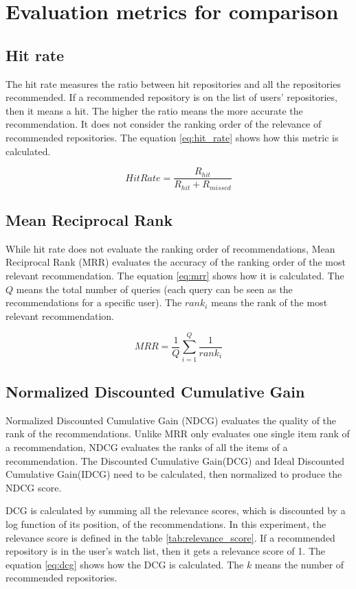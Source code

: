 \documentclass[11pt,twoside]{report}
\begin{document}
\section{Evaluation metrics for comparison}
\subsection{Hit rate}
The hit rate measures the ratio between hit repositories and all the repositories recommended. If a recommended repository is on the list of users' repositories, then it means a hit. The higher the ratio means the more accurate the recommendation. It does not consider the ranking order of the relevance of recommended repositories. The equation \ref{eq:hit_rate} shows how this metric is calculated.

\begin{equation}
    HitRate=\frac{R_{hit}}{R_{hit}+R_{missed}}
    \label{eq:hit_rate}
\end{equation}

\subsection{Mean Reciprocal Rank}
While hit rate does not evaluate the ranking order of recommendations, Mean Reciprocal Rank (MRR) evaluates the accuracy of the ranking order of the most relevant recommendation. The equation \ref{eq:mrr} shows how it is calculated. The $Q$ means the total number of queries (each query can be seen as the recommendations for a specific user). The $rank_i$ means the rank of the most relevant recommendation.

\begin{equation}
    MRR=\frac{1}{Q}\sum_{i=1}^Q\frac{1}{rank_i}
    \label{eq:mrr}
\end{equation}

\subsection{Normalized Discounted Cumulative Gain}
Normalized Discounted Cumulative Gain (NDCG) evaluates the quality of the rank of the recommendations. Unlike MRR only evaluates one single item rank of a recommendation, NDCG evaluates the ranks of all the items of a recommendation. The Discounted Cumulative Gain(DCG) and Ideal Discounted Cumulative Gain(IDCG) need to be calculated, then normalized to produce the NDCG score. 

DCG is calculated by summing all the relevance scores, which is discounted by a log function of its position, of the recommendations. In this experiment, the relevance score is defined in the table \ref{tab:relevance_score}. If a recommended repository is in the user's watch list, then it gets a relevance score of 1. The equation \ref{eq:dcg} shows how the DCG is calculated. The $k$ means the number of recommended repositories.
\end{document}
